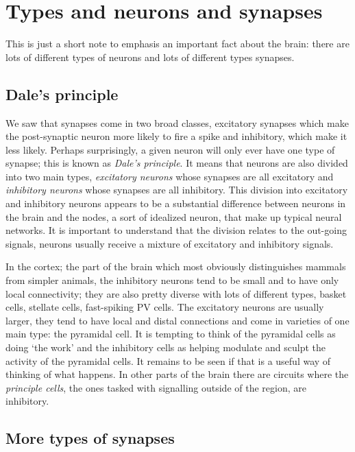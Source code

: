 \documentclass[12pt]{article}
\begin{document}
\section*{Types and neurons and synapses}

This is just a short note to emphasis an important fact about the
brain: there are lots of different types of neurons and lots of
different types synapses.

\subsection*{Dale's principle}

We saw that synapses come in two broad classes, excitatory synapses
which make the post-synaptic neuron more likely to fire a spike and
inhibitory, which make it less likely. Perhaps surprisingly, a given
neuron will only ever have one type of synapse; this is known as
\textsl{Dale's principle}. It means that neurons are also divided into
two main types, \textsl{excitatory neurons} whose synapses are all
excitatory and \textsl{inhibitory neurons} whose synapses are all
inhibitory. This division into excitatory and inhibitory neurons
appears to be a substantial difference between neurons in the brain
and the nodes, a sort of idealized neuron, that make up typical neural
networks. It is important to understand that the division relates to
the out-going signals, neurons usually receive a mixture of excitatory
and inhibitory signals.

In the cortex; the part of the brain which most obviously
distinguishes mammals from simpler animals, the inhibitory neurons
tend to be small and to have only local connectivity; they are also
pretty diverse with lots of different types, basket cells, stellate
cells, fast-spiking PV cells. The excitatory neurons are usually
larger, they tend to have local and distal connections and come in
varieties of one main type: the pyramidal cell. It is tempting to
think of the pyramidal cells as doing `the work' and the inhibitory
cells as helping modulate and sculpt the activity of the pyramidal
cells. It remains to be seen if that is a useful way of thinking of
what happens. In other parts of the brain there are circuits where the
\textsl{principle cells}, the ones tasked with signalling outside of
the region, are inhibitory.


\subsection*{More types of synapses}
\end{document}
